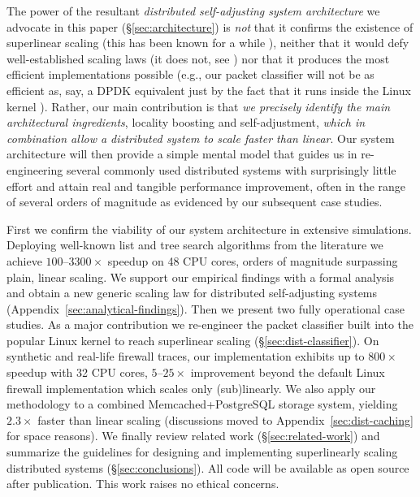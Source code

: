 The power of the resultant \emph{distributed self-adjusting system architecture} we advocate in this paper (\S\ref{sec:architecture}) is \emph{not} that it confirms the existence of superlinear scaling (this has been known for a while \cite{dobb-1, dobb-2}), neither that it would defy well-established scaling laws (it does not, see \cite{80148, gunther-hotsos, 10.1016/0167-8191(86)90024-4,10.1145/2773212.2789974}) nor that it produces the most efficient implementations possible (e.g., our packet classifier will not be as efficient as, say, a DPDK equivalent \cite{rte-acl} just by the fact that it runs inside the Linux kernel \cite{295475}). Rather, our main contribution is that \emph{we precisely identify the main architectural ingredients}, locality boosting and self-adjustment, \emph{which in combination allow a distributed system to scale faster than linear}. Our system architecture will then provide a simple mental model that guides us in re-engineering several commonly used distributed systems with surprisingly little effort and attain real and tangible performance improvement, often in the range of several orders of magnitude as evidenced by our subsequent case studies.

First we confirm the viability of our system architecture in extensive simulations. Deploying well-known list and tree search algorithms from the literature %
we achieve $100$--$3300\times$ speedup on 48 CPU cores, orders of magnitude surpassing plain, linear scaling. We support our empirical findings with a formal analysis and obtain a new generic scaling law for distributed self-adjusting systems (Appendix~\ref{sec:analytical-findings}). Then we present two fully operational case studies. As a major contribution we re-engineer the packet classifier built into the popular Linux kernel to reach superlinear scaling (\S\ref{sec:dist-classifier}). On synthetic and real-life firewall traces, our implementation exhibits up to $800\times$ speedup with 32 CPU cores, $5$--$25\times$ improvement beyond the default Linux firewall implementation which scales only (sub)linearly. We also apply our methodology to a combined Memcached+PostgreSQL storage system, yielding $2.3\times$ faster than linear scaling (discussions moved to Appendix~\ref{sec:dist-caching} for space reasons). We finally review related work (\S\ref{sec:related-work}) and summarize the guidelines for designing and implementing superlinearly scaling distributed systems (\S\ref{sec:conclusions}). All code will be available as open source after publication. This work raises no ethical concerns. 



